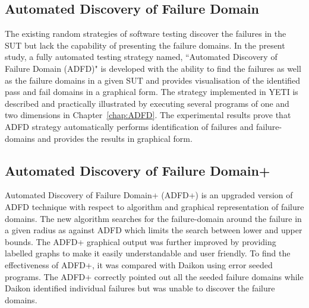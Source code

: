 \subsection{Automated Discovery of Failure Domain}
The existing random strategies of software testing discover the failures in the SUT but lack the capability of presenting the failure domains. In the present study, a fully automated testing strategy named, ``Automated Discovery of Failure Domain (ADFD)" is developed with the ability to find the failures as well as the failure domains in a given SUT and provides visualisation of the identified pass and fail domains in a graphical form. The strategy implemented in YETI is described and practically illustrated by executing several programs of one and two dimensions in Chapter~\ref{chap:ADFD}. The experimental results prove that ADFD strategy automatically performs identification of failures and failure-domains and provides the results in graphical form.

\subsection{Automated Discovery of Failure Domain+}
Automated Discovery of Failure Domain+ (ADFD+) is an upgraded version of ADFD technique with respect to algorithm and graphical representation of failure domains. The new algorithm searches for the failure-domain around the failure in a given radius as against ADFD which limits the search between lower and upper bounds. The ADFD+ graphical output was further improved by providing labelled graphs to make it easily understandable and user friendly. To find the effectiveness of ADFD+, it was compared with Daikon using error seeded programs. The ADFD+ correctly pointed out all the seeded failure domains while Daikon identified individual failures but was unable to discover the failure domains.



